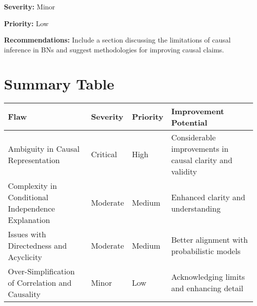 \documentclass{article}
\begin{document}
\textbf{Severity:} Minor

\textbf{Priority:} Low

\textbf{Recommendations:} Include a section discussing the limitations of causal inference in BNs and suggest methodologies for improving causal claims.

\section*{Summary Table}

\begin{longtable}{|p{3cm}|p{3cm}|p{3cm}|p{3cm}|}
\hline
\textbf{Flaw} & \textbf{Severity} & \textbf{Priority} & \textbf{Improvement Potential} \\
\hline
Ambiguity in Causal Representation & Critical & High & Considerable improvements in causal clarity and validity \\
\hline
Complexity in Conditional Independence Explanation & Moderate & Medium & Enhanced clarity and understanding \\
\hline
Issues with Directedness and Acyclicity & Moderate & Medium & Better alignment with probabilistic models \\
\hline
Over-Simplification of Correlation and Causality & Minor & Low & Acknowledging limits and enhancing detail \\
\hline
\end{longtable}
\end{document}

